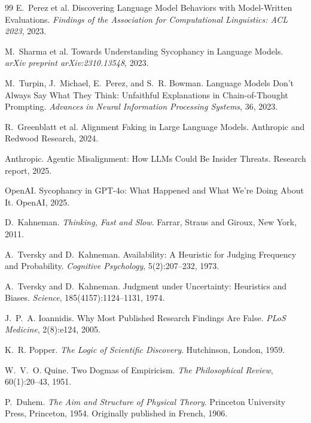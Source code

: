 \documentclass[11pt]{article}
\begin{document}
\begin{thebibliography}{99}
E.~Perez et al.
\newblock Discovering Language Model Behaviors with Model-Written Evaluations.
\newblock \emph{Findings of the Association for Computational Linguistics:
ACL 2023}, 2023.

M.~Sharma et al.
\newblock Towards Understanding Sycophancy in Language Models.
\newblock \emph{arXiv preprint arXiv:2310.13548}, 2023.

M.~Turpin, J.~Michael, E.~Perez, and S.~R. Bowman.
\newblock Language Models Don't Always Say What They Think:
Unfaithful Explanations in Chain-of-Thought Prompting.
\newblock \emph{Advances in Neural Information Processing Systems},
36, 2023.

R.~Greenblatt et al.
\newblock Alignment Faking in Large Language Models.
\newblock Anthropic and Redwood Research, 2024.

Anthropic.
\newblock Agentic Misalignment: How LLMs Could Be Insider Threats.
\newblock Research report, 2025.

OpenAI.
\newblock Sycophancy in GPT-4o: What Happened and What We're Doing About It.
\newblock OpenAI, 2025.

D.~Kahneman.
\newblock \emph{Thinking, Fast and Slow}.
\newblock Farrar, Straus and Giroux, New York, 2011.

A.~Tversky and D.~Kahneman.
\newblock Availability: A Heuristic for Judging Frequency and Probability.
\newblock \emph{Cognitive Psychology}, 5(2):207--232, 1973.

A.~Tversky and D.~Kahneman.
\newblock Judgment under Uncertainty: Heuristics and Biases.
\newblock \emph{Science}, 185(4157):1124--1131, 1974.

J.~P.~A. Ioannidis.
\newblock Why Most Published Research Findings Are False.
\newblock \emph{PLoS Medicine}, 2(8):e124, 2005.

K.~R. Popper.
\newblock \emph{The Logic of Scientific Discovery}.
\newblock Hutchinson, London, 1959.

W.~V.~O. Quine.
\newblock Two Dogmas of Empiricism.
\newblock \emph{The Philosophical Review}, 60(1):20--43, 1951.

P.~Duhem.
\newblock \emph{The Aim and Structure of Physical Theory}.
\newblock Princeton University Press, Princeton, 1954.
\newblock Originally published in French, 1906.


\end{thebibliography}
\end{document}
